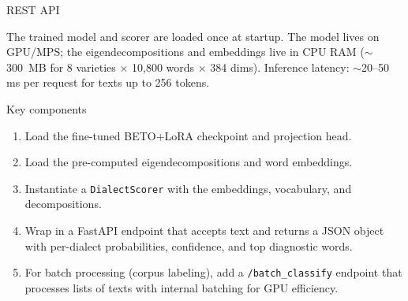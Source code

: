\documentclass[11pt,a4paper]{article}
\begin{document}
\begin{archbox}{REST API}
\begin{center}
\end{center}

The trained model and scorer are loaded once at startup. The model
lives on GPU/MPS; the eigendecompositions and embeddings live in CPU
RAM ($\sim$300~MB for 8 varieties $\times$ 10,800 words $\times$
384 dims). Inference latency: $\sim$20--50\,ms per request for texts
up to 256 tokens.
\end{archbox}

\begin{buildbox}{Key components}
\begin{enumerate}[nosep]
  \item Load the fine-tuned BETO+LoRA checkpoint and projection head.
  \item Load the pre-computed eigendecompositions and word embeddings.
  \item Instantiate a \texttt{DialectScorer} with the embeddings,
        vocabulary, and decompositions.
  \item Wrap in a FastAPI endpoint that accepts text and returns a
        JSON object with per-dialect probabilities, confidence, and
        top diagnostic words.
  \item For batch processing (corpus labeling), add a
        \texttt{/batch\_classify} endpoint that processes lists of
        texts with internal batching for GPU efficiency.
\end{enumerate}
\end{buildbox}
\end{document}
